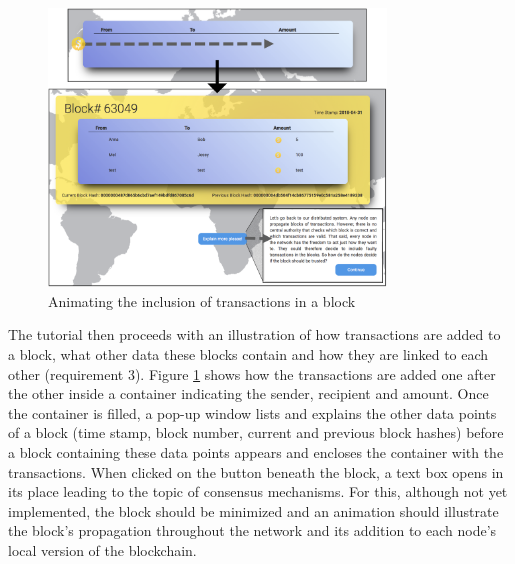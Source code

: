 \begin{figure}
    \centering
      \includegraphics[width=0.8\textwidth]{latex-vorlage_v1.5/graphics/Animations3Block.png} 
    \caption{Animating the inclusion of transactions in a block}
    \label{fig:AnimationBlock}
\end{figure}

The tutorial then proceeds with an illustration of how transactions are added to a block, what other data these blocks contain and how they are linked to each other (requirement 3). Figure \ref{fig:AnimationBlock} shows how the transactions are added one after the other inside a container indicating the sender, recipient and amount. Once the container is filled, a pop-up window lists and explains the other data points of a block (time stamp, block number, current and previous block hashes) before a block containing these data points appears and encloses the container with the transactions. When clicked on the button beneath the block, a text box opens in its place leading to the topic of consensus mechanisms. For this, although not yet implemented, the block should be minimized and an animation should illustrate the block's propagation throughout the network and its addition to each node's local version of the blockchain.

